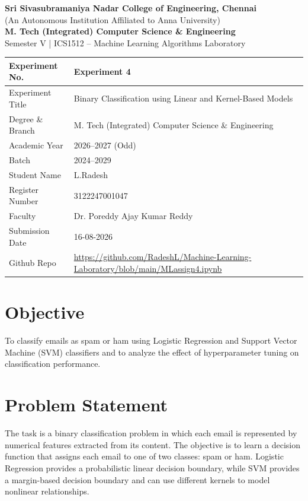 \documentclass[12pt,a4paper]{article}
\begin{document}
\begin{center}
{\Large \textbf{Sri Sivasubramaniya Nadar College of Engineering, Chennai}}\\[2mm]
{\normalsize (An Autonomous Institution Affiliated to Anna University)}\\[3mm]
{\normalsize \textbf{M. Tech (Integrated) Computer Science \& Engineering}}\\
{\normalsize Semester V \quad | \quad ICS1512 -- Machine Learning Algorithms Laboratory}
\end{center}

\vspace{4mm}

\begin{tabular}{|p{4cm}|p{11cm}|}
\hline
Experiment No. & Experiment 4 \\ \hline
Experiment Title & Binary Classification using Linear and Kernel-Based Models \\ \hline
Degree \& Branch & M. Tech (Integrated) Computer Science \& Engineering \\ \hline
Academic Year & 2026--2027 (Odd) \\ \hline
Batch & 2024--2029 \\ \hline
Student Name & L.Radesh\\ \hline
Register Number & 3122247001047\\ \hline
Faculty & Dr. Poreddy Ajay Kumar Reddy \\ \hline
Submission Date & 16-08-2026\\ \hline
Github Repo & \url{https://github.com/RadeshL/Machine-Learning-Laboratory/blob/main/MLassign4.ipynb} \\ \hline
\end{tabular}

\section{Objective}
To classify emails as spam or ham using Logistic Regression and Support Vector Machine (SVM) classifiers and to analyze the effect of hyperparameter tuning on classification performance.

\section{Problem Statement}
The task is a binary classification problem in which each email is represented by numerical features extracted from its content. The objective is to learn a decision function that assigns each email to one of two classes: spam or ham. Logistic Regression provides a probabilistic linear decision boundary, while SVM provides a margin-based decision boundary and can use different kernels to model nonlinear relationships.
\end{document}
